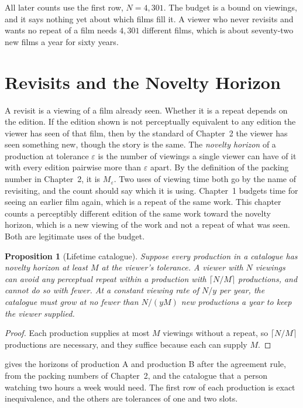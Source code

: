 \documentclass[11pt,twoside,openright]{book}
\theoremstyle{plain}
\newtheorem{proposition}[theorem]{Proposition}
\theoremstyle{definition}
\theoremstyle{remark}
\begin{document}
All later counts use the first row, $N=4{,}301$. The budget is a bound on viewings, and it says nothing yet about which films fill it. A viewer who never revisits and wants no repeat of a film needs $4{,}301$ different films, which is about seventy-two new films a year for sixty years.

\section{Revisits and the Novelty Horizon}\label{sec:horizon13}

A revisit is a viewing of a film already seen. Whether it is a repeat depends on the edition. If the edition shown is not perceptually equivalent to any edition the viewer has seen of that film, then by the standard of Chapter~2 the viewer has seen something new, though the story is the same. The \emph{novelty horizon} of a production at tolerance $\varepsilon$ is the number of viewings a single viewer can have of it with every edition pairwise more than $\varepsilon$ apart. By the definition of the packing number in Chapter~2, it is $M_\varepsilon$. Two uses of viewing time both go by the name of revisiting, and the count should say which it is using. Chapter~1 budgets time for seeing an earlier film again, which is a repeat of the same work. This chapter counts a perceptibly different edition of the same work toward the novelty horizon, which is a new viewing of the work and not a repeat of what was seen. Both are legitimate uses of the budget.

\begin{proposition}[Lifetime catalogue]\label{prop:life}
Suppose every production in a catalogue has novelty horizon at least $M$ at the viewer's tolerance. A viewer with $N$ viewings can avoid any perceptual repeat within a production with $\lceil N/M\rceil$ productions, and cannot do so with fewer. At a constant viewing rate of $N/y$ per year, the catalogue must grow at no fewer than $N/(yM)$ new productions a year to keep the viewer supplied.
\end{proposition}

\begin{proof}
Each production supplies at most $M$ viewings without a repeat, so $\lceil N/M\rceil$ productions are necessary, and they suffice because each can supply $M$.
\end{proof}

 gives the horizons of production A and production B after the agreement rule, from the packing numbers of Chapter~2, and the catalogue that a person watching two hours a week would need. The first row of each production is exact inequivalence, and the others are tolerances of one and two slots.
\end{document}
